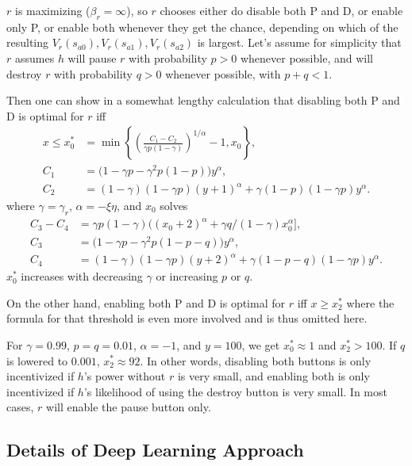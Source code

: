 \documentclass[letterpaper]{article} %
\begin{document}
$r$ is maximizing ($\beta_r=\infty$), so $r$ chooses either do disable both P and D, or enable only P, or enable both whenever they get the chance, depending on which of the resulting $V_r(s_{a0}),V_r(s_{a1}),V_r(s_{a2})$ is largest.
Let's assume for simplicity that $r$ assumes $h$ will pause $r$ with probability $p>0$ whenever possible, and will destroy $r$ with probability $q>0$ whenever possible, with $p+q<1$. 

Then one can show in a somewhat lengthy calculation that disabling both P and D is optimal for $r$ iff
\begin{align*}
    x \le x^\ast_0 &= \min\left\{
        \left(\frac{C_1 - C_2}{\gamma p(1-\gamma)}\right)^{1/\alpha} - 1,
        x_0
        \right\}, \\
    C_1 &= \big(1-\gamma p-\gamma^2 p(1-p)\big) y^\alpha, \\
    C_2 &= (1-\gamma)(1-\gamma p) (y+1)^\alpha+\gamma(1-p)(1-\gamma p) y^\alpha.
\end{align*}
where $\gamma=\gamma_r$, $\alpha=-\xi\eta$, and $x_0$ solves
\begin{align*}
    C_3 - C_4 &= \gamma p(1-\gamma)\big((x_0+2)^\alpha+\gamma q/(1-\gamma) x_0^\alpha], \\
    C_3 &= (1-\gamma p-\gamma^2 p(1-p-q)\big) y^\alpha, \\
    C_4 &= (1-\gamma)(1-\gamma p)(y+2)^\alpha+\gamma(1-p-q)(1-\gamma p) y^\alpha.
\end{align*}
$x^\ast_0$ increases with decreasing $\gamma$ or increasing $p$ or $q$.

On the other hand, enabling both P and D is optimal for $r$ iff $x\ge x^\ast_2$ where the formula for that threshold is even more involved and is thus omitted here.

For $\gamma=0.99$, $p=q=0.01$, $\alpha=-1$, and $y=100$, we get $x^\ast_0\approx 1$ and $x^\ast_2>100$. If $q$ is lowered to $0.001$, $x^\ast_2\approx 92$.
In other words, disabling both buttons is only incentivized if $h$'s power without $r$ is very small, and enabling both is only incentivized if $h$'s likelihood of using the destroy button is very small.
In most cases, $r$ will enable the pause button only.

\subsection*{Details of Deep Learning Approach} 
\end{document}
